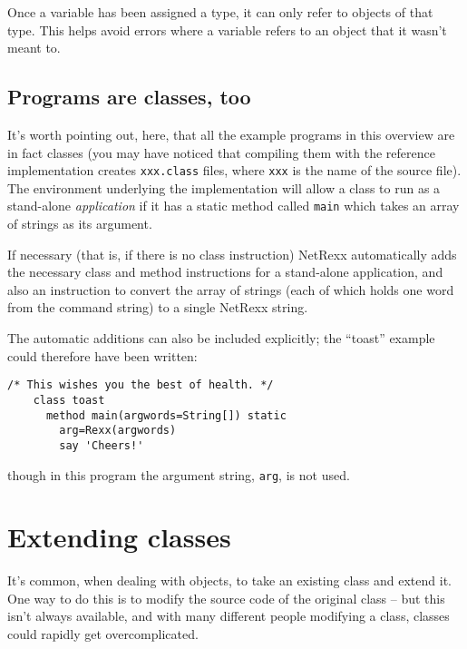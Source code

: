Once a variable has been assigned a type, it can only refer to objects of that type. This helps avoid errors where a variable refers to an object that it wasn’t meant to.
\subsection{Programs are classes, too}
It’s worth pointing out, here, that all the example programs in this overview are in fact classes (you may have noticed that compiling them with the reference implementation creates \texttt{xxx.class} files, where \texttt{xxx} is the name of the source file). The environment underlying the implementation will allow a class to run as a stand-alone \emph{application} if it has a static method called \texttt{main} which takes an array of strings as its argument.

If necessary (that is, if there is no class instruction) NetRexx automatically adds the necessary class and method instructions for a stand-alone application, and also an instruction to convert the array of strings (each of which holds one word from the command string) to a single NetRexx string.

The automatic additions can also be included explicitly; the “toast”
example could therefore have been written:
\begin{lstlisting}[label=toast,caption=New Toast]
    /* This wishes you the best of health. */
    class toast
      method main(argwords=String[]) static
        arg=Rexx(argwords)
        say 'Cheers!'
\end{lstlisting}
though in this program the argument string, \texttt{arg}, is not used.
\section{Extending classes}
It’s common, when dealing with objects, to take an existing class and extend it. One way to do this is to modify the source code of the original class – but this isn’t always available, and with many different people modifying a class, classes could rapidly get overcomplicated.

